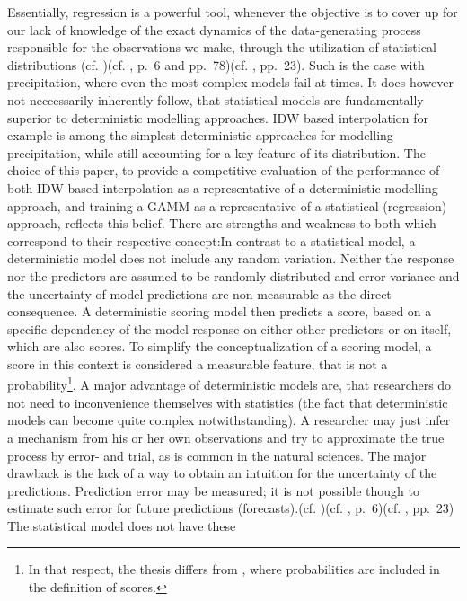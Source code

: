 \documentclass[
  12pt,
]{article}
\begin{document}
Essentially, regression is a powerful tool, whenever the objective is to
cover up for our lack of knowledge of the exact dynamics of the
data-generating process responsible for the observations we make,
through the utilization of statistical distributions (cf.
\citet{Zumel.2014})(cf. \citet{Wikle.2019}, p.~6 and pp.~78)(cf.
\citet{Fahrmeir.2021}, pp.~23). Such is the case with precipitation,
where even the most complex models fail at times. It does however not
neccessarily inherently follow, that statistical models are
fundamentally superior to deterministic modelling approaches. IDW based
interpolation for example is among the simplest deterministic approaches
for modelling precipitation, while still accounting for a key feature of
its distribution. The choice of this paper, to provide a competitive
evaluation of the performance of both IDW based interpolation as a
representative of a deterministic modelling approach, and training a
GAMM as a representative of a statistical (regression) approach,
reflects this belief. There are strengths and weakness to both which
correspond to their respective concept:\newline In contrast to a
statistical model, a deterministic model does not include any random
variation. Neither the response nor the predictors are assumed to be
randomly distributed and error variance and the uncertainty of model
predictions are non-measurable as the direct consequence. A
deterministic scoring model then predicts a score, based on a specific
dependency of the model response on either other predictors or on
itself, which are also scores. To simplify the conceptualization of a
scoring model, a score in this context is considered a measurable
feature, that is not a
probability\footnote{In that respect, the thesis differs from \cite{Zumel.2014}, where probabilities are included in the definition of scores.}.
A major advantage of deterministic models are, that researchers do not
need to inconvenience themselves with statistics (the fact that
deterministic models can become quite complex notwithstanding). A
researcher may just infer a mechanism from his or her own observations
and try to approximate the true process by error- and trial, as is
common in the natural sciences. The major drawback is the lack of a way
to obtain an intuition for the uncertainty of the predictions.
Prediction error may be measured; it is not possible though to estimate
such error for future predictions (forecasts).\newline (cf.
\citet{Zumel.2014})(cf. \citet{Wikle.2019}, p.~6)(cf.
\citet{Fahrmeir.2021}, pp.~23) The statistical model does not have these
\end{document}
